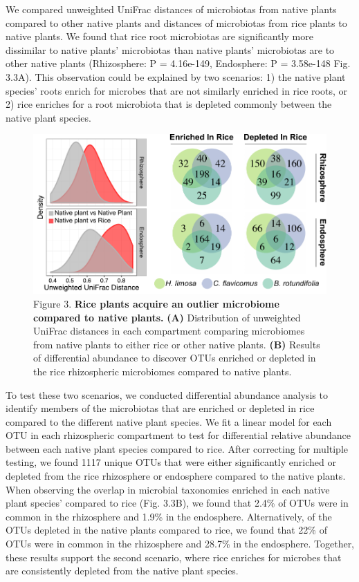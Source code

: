 We compared unweighted UniFrac distances of microbiotas from native plants compared to other native plants and distances of microbiotas from rice plants to native plants. We found that rice root microbiotas are significantly more dissimilar to native plants' microbiotas than native plants' microbiotas are to other native plants (Rhizosphere: P = 4.16e-149, Endosphere: P = 3.58e-148 Fig. 3.3A). This observation could be explained by two scenarios: 1) the native plant species' roots enrich for microbes that are not similarly enriched in rice roots, or 2) rice enriches for a root microbiota that is depleted commonly between the native plant species.

\begin{figure}[h]
\centering
\includegraphics[width=5in]{Figures/figure2_3}
\caption[Figure 3.3]{Figure 3. \textbf{Rice plants acquire an outlier microbiome compared to native plants.} \textbf{(A)} Distribution of unweighted UniFrac distances in each compartment comparing microbiomes from native plants to either rice or other native plants. \textbf{(B)} Results of differential abundance to discover OTUs enriched or depleted in the rice rhizospheric microbiomes compared to native plants.}
\label{Figure 3.3}
\end{figure}

To test these two scenarios, we conducted differential abundance analysis to identify members of the microbiotas that are enriched or depleted in rice compared to the different native plant species. We fit a linear model for each OTU in each rhizospheric compartment to test for differential relative abundance between each native plant species compared to rice. After correcting for multiple testing, we found 1117 unique OTUs that were either significantly enriched or depleted from the rice rhizosphere or endosphere compared to the native plants. When observing the overlap in microbial taxonomies enriched in each native plant species' compared to rice (Fig. 3.3B), we found that 2.4\% of OTUs were in common in the rhizosphere and 1.9\% in the endosphere. Alternatively, of the OTUs depleted in the native plants compared to rice, we found that 22\% of OTUs were in common in the rhizosphere and 28.7\% in the endosphere. Together, these results support the second scenario, where rice enriches for microbes that are consistently depleted from the native plant species. 


